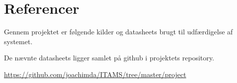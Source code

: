 \section{Referencer}\label{sec:refs}

Gennem projektet er følgende kilder og datasheets brugt til udfærdigelse af systemet. 

De nævnte datasheets ligger samlet på github i projektets repository.

\begin{center}
	\url{https://github.com/joachimda/ITAMS/tree/master/project}
\end{center}

